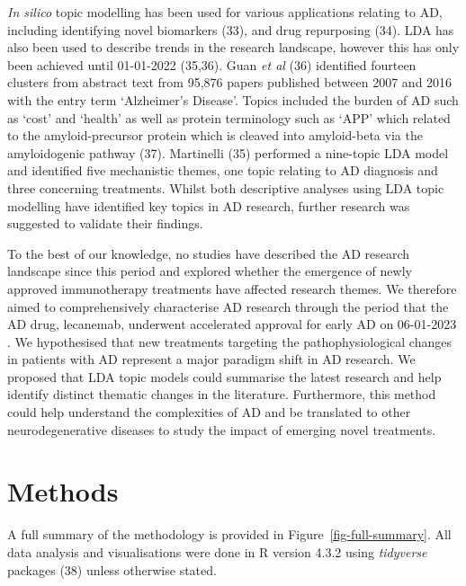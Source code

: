 \documentclass[
  a4paper,
]{article}
\begin{document}
\emph{In silico} topic modelling has been used for various applications
relating to AD, including identifying novel biomarkers (33), and drug
repurposing (34). LDA has also been used to describe trends in the
research landscape, however this has only been achieved until 01-01-2022
(35,36). Guan \emph{et al} (36) identified fourteen clusters from
abstract text from 95,876 papers published between 2007 and 2016 with
the entry term `Alzheimer's Disease'. Topics included the burden of AD
such as `cost' and `health' as well as protein terminology such as `APP'
which related to the amyloid-precursor protein which is cleaved into
amyloid-beta via the amyloidogenic pathway (37). Martinelli (35)
performed a nine-topic LDA model and identified five mechanistic themes,
one topic relating to AD diagnosis and three concerning treatments.
Whilst both descriptive analyses using LDA topic modelling have
identified key topics in AD research, further research was suggested to
validate their findings.

To the best of our knowledge, no studies have described the AD research
landscape since this period and explored whether the emergence of newly
approved immunotherapy treatments have affected research themes. We
therefore aimed to comprehensively characterise AD research through the
period that the AD drug, lecanemab, underwent accelerated approval for
early AD on 06-01-2023 . We hypothesised that new treatments targeting
the pathophysiological changes in patients with AD represent a major
paradigm shift in AD research. We proposed that LDA topic models could
summarise the latest research and help identify distinct thematic
changes in the literature. Furthermore, this method could help
understand the complexities of AD and be translated to other
neurodegenerative diseases to study the impact of emerging novel
treatments.

\newpage{}

\hypertarget{methods}{%
\section{Methods}\label{methods}}

A full summary of the methodology is provided in
Figure~\ref{fig-full-summary}. All data analysis and visualisations were
done in R version 4.3.2 using \emph{tidyverse} packages (38) unless
otherwise stated.
\end{document}
